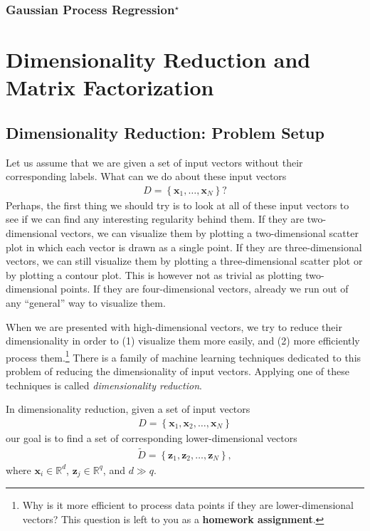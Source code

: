 \documentclass{report}
\newcommand{\vect}[1]{\mathbf{#1}}
\newcommand{\vx}[0]{\vect{x}}
\newcommand{\vz}[0]{\vect{z}}
\newcommand{\RR}[0]{\mathbb{R}}
\begin{document}
\subsection{Gaussian Process Regression$^\star$}


\chapter{Dimensionality Reduction and Matrix Factorization}
\label{chap:dimred}


\section{Dimensionality Reduction: Problem Setup}
\label{sec:dimred}

Let us assume that we are given a set of input vectors without their
corresponding labels. What can we do about these input vectors 
\begin{align*}
    D=\left\{
    \vx_1, \ldots, \vx_N
\right\}?
\end{align*}
Perhaps, the first thing we should try is to look at all of these input vectors
to see if we can find any interesting regularity behind them. If they are
two-dimensional vectors, we can visualize them by plotting a two-dimensional
scatter plot in which each vector is drawn as a single point. If they are
three-dimensional vectors, we can still visualize them by plotting a
three-dimensional scatter plot or by plotting a contour plot. This is however
not as trivial as plotting two-dimensional points. If they are four-dimensional
vectors, already we run out of any ``general'' way to visualize them.

When we are presented with high-dimensional vectors, we try to reduce their
dimensionality in order to (1) visualize them more easily, and (2) more
efficiently process them.\footnote{
    Why is it more efficient to process data points if they are
    lower-dimensional vectors? This question is left to you as a {\bf homework
    assignment}.
} There is a family of machine learning techniques dedicated to this problem of
reducing the dimensionality of input vectors. Applying one of these techniques
is called {\it dimensionality reduction}.

In dimensionality reduction, given a set of input vectors 
\begin{align*}
    D=\left\{
    \vx_1, \vx_2, \ldots, \vx_N
\right\}
\end{align*}
our goal is to find a set of corresponding lower-dimensional vectors
\begin{align*}
    \tilde{D} = \left\{
        \vz_1, \vz_2, \ldots, \vz_N
    \right\},
\end{align*}
where $\vx_i \in \RR^d$, $\vz_j \in \RR^q$, and $d \gg q$. 
\end{document}
